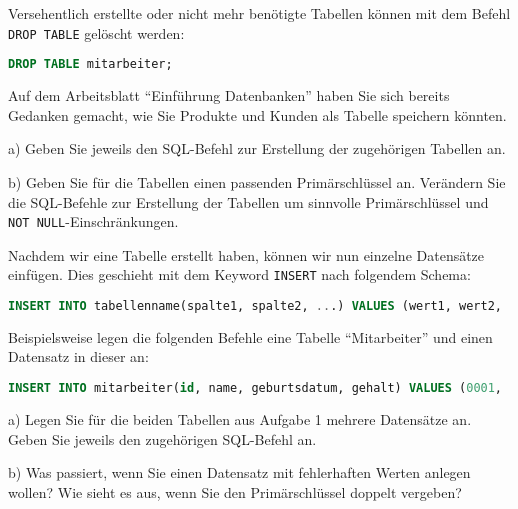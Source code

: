\documentclass[11pt, a4paper, oneside]{article}
\begin{document}
	Versehentlich erstellte oder nicht mehr benötigte Tabellen können mit dem Befehl \texttt{DROP TABLE} gelöscht werden:
	
	\begin{lstlisting}[language=sql]
DROP TABLE mitarbeiter;
	\end{lstlisting}
	
	\pagebreak
	
	Auf dem Arbeitsblatt ``Einführung Datenbanken'' haben Sie sich bereits Gedanken gemacht, wie Sie Produkte und Kunden als Tabelle speichern könnten.
	
	a) Geben Sie jeweils den SQL-Befehl zur Erstellung der zugehörigen Tabellen an.
	
	\boxarea[5cm]
	
	
	
	b) Geben Sie für die Tabellen einen passenden Primärschlüssel an.
	Verändern Sie die SQL-Befehle zur Erstellung der Tabellen um sinnvolle Primärschlüssel und \texttt{NOT NULL}-Einschränkungen.
	
	\boxarea
	
	
	Nachdem wir eine Tabelle erstellt haben, können wir nun einzelne Datensätze einfügen.
	Dies geschieht mit dem Keyword \texttt{INSERT} nach folgendem Schema:
	\begin{lstlisting}[language=sql]
INSERT INTO tabellenname(spalte1, spalte2, ...) VALUES (wert1, wert2, ...);
	\end{lstlisting}
	
	Beispielsweise legen die folgenden Befehle eine Tabelle ``Mitarbeiter'' und einen Datensatz in dieser an:
	\begin{lstlisting}[language=sql]
INSERT INTO mitarbeiter(id, name, geburtsdatum, gehalt) VALUES (0001,   'Thomas Müller', '1980-03-25', 4250.00);
	\end{lstlisting}
	
	a) Legen Sie für die beiden Tabellen aus Aufgabe 1 mehrere Datensätze an.
	Geben Sie jeweils den zugehörigen SQL-Befehl an.
	
	\boxarea[7cm]
	
	b) Was passiert, wenn Sie einen Datensatz mit fehlerhaften Werten anlegen wollen?
	Wie sieht es aus, wenn Sie den Primärschlüssel doppelt vergeben?
	
	\boxarea
	
\end{document}
